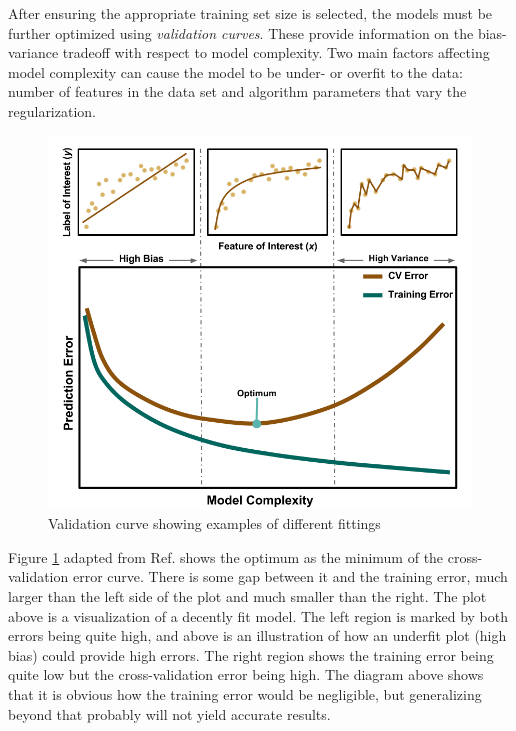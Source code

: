 After ensuring the appropriate training set size is selected, the models must
be further optimized using \textit{validation curves}.  These provide
information on the bias-variance tradeoff with respect to model complexity. Two
main factors affecting model complexity can cause the model to be under- or
overfit to the data: number of features in the data set and algorithm
parameters that vary the regularization.

\begin{figure}[!htb]
  \centering
  \includegraphics[width=1.05\linewidth]{./chapters/litrev/ValidationCurve.png}
  \caption{Validation curve showing examples of different fittings}
  \label{fig:validation}
\end{figure}

Figure \ref{fig:validation} adapted from Ref. \cite{elements_stats} shows the
optimum as the minimum of the cross-validation error curve. There is some gap
between it and the training error, much larger than the left side of the plot
and much smaller than the right.  The plot above is a visualization of a
decently fit model.  The left region is marked by both errors being quite high,
and above is an  illustration of how an underfit plot (high bias) could provide
high errors. The right region shows the training error being quite low but the
cross-validation error being high. The diagram above shows that it is obvious
how the training error would be negligible, but generalizing beyond that
probably will not yield accurate results. 

